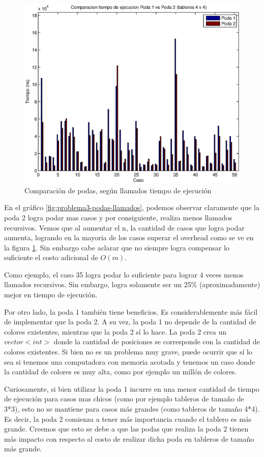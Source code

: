 \begin{center}
  \begin{figure}[H]
\includegraphics[width=\linewidth]{problema3/graficos/comparacion_podas1y2_tiempo.eps}
    \caption{Comparación de podas, según llamados tiempo de ejecución}
    \label{fig:problema3-podas-tiempo}
  \end{figure}
\end{center}


En el gráfico \ref{fig:problema3-podas-llamados}, podemos observar claramente que la poda 2 logra podar mas casos y por consiguiente, realiza menos llamados recursivos. Vemos que al aumentar el n, la cantidad de casos que logra podar aumenta, logrando en la mayoria de los casos superar el overhead como se ve en la figura \ref{fig:problema3-podas-tiempo}. Sin embargo cabe aclarar que no siempre logra compensar lo suficiente el costo adicional de $O(m)$.

Como ejemplo, el caso 35 logra podar lo suficiente para lograr 4 veces menos llamados recursivos. Sin embargo, logra solamente ser un 25\% (aproximadamente) mejor en tiempo de ejecución.

Por otro lado, la poda 1 también tiene beneficios. Es considerablemente más fácil de implementar que la poda 2. A su vez, la poda 1 no depende de la cantidad de colores existentes, mientras que la poda 2 sí lo hace. La poda 2 crea un $vector<int>$ donde la cantidad de posiciones se corresponde con la cantidad de colores existentes. Si bien no es un problema muy grave, puede ocurrir que sí lo sea si tenemos una computadora con memoria acotada y tenemos un caso donde la cantidad de colores es muy alta, como por ejemplo un millón de colores.

Curiosamente, si bien utilizar la poda 1 incurre en una menor cantidad de tiempo de ejecución para casos mas chicos (como por ejemplo tableros de tamaño de 3*3), esto no se mantiene para casos más grandes (como tableros de tamaño 4*4). Es decir, la poda 2 comienza a tener más importancia cuando el tablero es más grande. Creemos que esto se debe a que las podas que realiza la poda 2 tienen más impacto con respecto al costo de realizar dicha poda en tableros de tamaño más grande.